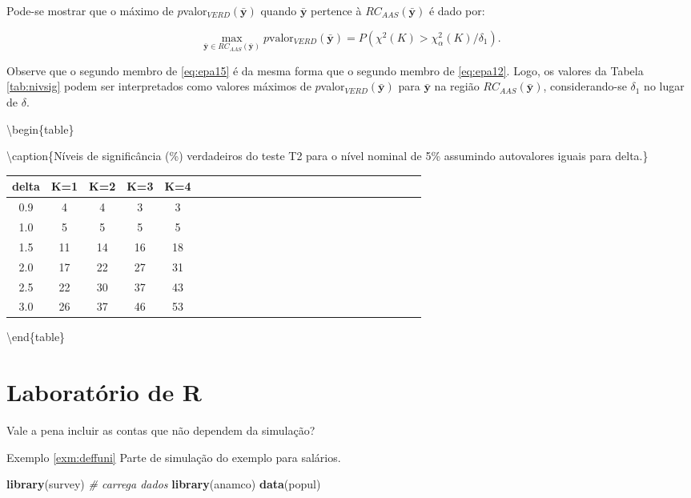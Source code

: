 \documentclass[]{book}
\newenvironment{Shaded}{\begin{snugshade}}{\end{snugshade}}
\newcommand{\KeywordTok}[1]{\textcolor[rgb]{0.13,0.29,0.53}{\textbf{#1}}}
\newcommand{\CommentTok}[1]{\textcolor[rgb]{0.56,0.35,0.01}{\textit{#1}}}
\newcommand{\NormalTok}[1]{#1}
\theoremstyle{definition}
\theoremstyle{definition}
\theoremstyle{definition}
\theoremstyle{remark}
\begin{document}
Pode-se mostrar que o máximo de
\(p\)valor\(_{VERD}\left( \mathbf{\bar{y}}\right)\) quando
\(\mathbf{\bar{y}}\) pertence à
\(RC_{AAS}\left( \mathbf{\bar{y}}\right)\) é dado por:

\begin{equation}
\max_{\mathbf{\bar{y}\in }RC_{AAS}\left( \mathbf{\bar{y}}\right) }p
\mbox{valor}_{VERD}\left( \mathbf{\bar{y}}\right) =P\left( \chi ^{2}\left(K\right) >\chi _{\alpha }^{2}\left( K\right) /\delta _{1}\right).
\label{eq:epa15}
\end{equation}

Observe que o segundo membro de \eqref{eq:epa15} é da mesma forma que o
segundo membro de \eqref{eq:epa12}. Logo, os valores da Tabela
\ref{tab:nivsig} podem ser interpretados como valores máximos de
\(p\)valor\(_{VERD}\left( \mathbf{\bar{y}}\right)\) para
\(\mathbf{\bar{y}}\) na região
\(RC_{AAS}\left(\mathbf{\bar{y}}\right)\), considerando-se
\(\delta_{1}\) no lugar de \(\delta\).

\textbackslash{}begin\{table\}

\textbackslash{}caption\{\label{tab:nivsig}Níveis de significância (\%)
verdadeiros do teste T2 para o nível nominal de 5\% assumindo
autovalores iguais para delta.\} \centering

\begin{tabular}[t]{ccccccccccccccccccccccccc}
\toprule
delta & K=1 & K=2 & K=3 & K=4\\
\midrule
0.9 & 4 & 4 & 3 & 3\\
1.0 & 5 & 5 & 5 & 5\\
1.5 & 11 & 14 & 16 & 18\\
2.0 & 17 & 22 & 27 & 31\\
2.5 & 22 & 30 & 37 & 43\\
3.0 & 26 & 37 & 46 & 53\\
\bottomrule
\end{tabular}

\textbackslash{}end\{table\}

\section{Laboratório de R}\label{laboratorio-de-r-1}

Vale a pena incluir as contas que não dependem da simulação?

Exemplo \ref{exm:deffuni} Parte de simulação do exemplo para salários.

\begin{Shaded}
\begin{Highlighting}[]
\KeywordTok{library}\NormalTok{(survey)}
\CommentTok{# carrega dados}
\KeywordTok{library}\NormalTok{(anamco)}
\KeywordTok{data}\NormalTok{(popul)}
\end{Highlighting}
\end{Shaded}
\end{document}
